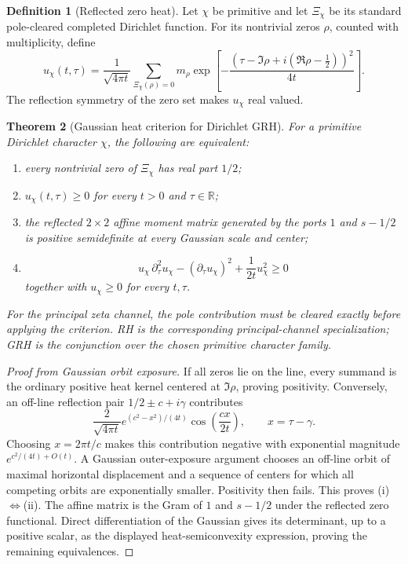 \documentclass[11pt]{article}
\newtheorem{theorem}{Theorem}[section]
\theoremstyle{definition}
\newtheorem{definition}[theorem]{Definition}
\theoremstyle{remark}
\newcommand{\R}{\mathbb R}
\begin{document}
\begin{definition}[Reflected zero heat]
Let $\chi$ be primitive and let $\Xi_\chi$ be its standard pole-cleared
completed Dirichlet function.  For its nontrivial zeros $\rho$, counted with
multiplicity, define
\[
 \boxed{
 u_\chi(t,\tau)
 =\frac1{\sqrt{4\pi t}}
 \sum_{\Xi_\chi(\rho)=0}m_\rho
 \exp\!\left[-\frac{(\tau-\Im\rho
 +i(\Re\rho-\tfrac12))^2}{4t}\right].}
\]
The reflection symmetry of the zero set makes $u_\chi$ real valued.
\end{definition}

\begin{theorem}[Gaussian heat criterion for Dirichlet GRH]
\label{thm:GRH-heat-master}
For a primitive Dirichlet character $\chi$, the following are equivalent:
\begin{enumerate}[label=\textup{(\roman*)},leftmargin=2.7em]
\item every nontrivial zero of $\Xi_\chi$ has real part $1/2$;
\item $u_\chi(t,\tau)\ge0$ for every $t>0$ and $\tau\in\R$;
\item the reflected $2\times2$ affine moment matrix generated by the ports
      $1$ and $s-1/2$ is positive semidefinite at every Gaussian scale and
      center;
\item
      \[
       u_\chi\,\partial_\tau^2u_\chi
       -(\partial_\tau u_\chi)^2
       +\frac1{2t}u_\chi^2\ge0
      \]
      together with $u_\chi\ge0$ for every $t,\tau$.
\end{enumerate}
For the principal zeta channel, the pole contribution must be cleared exactly
before applying the criterion.  RH is the corresponding principal-channel
specialization; GRH is the conjunction over the chosen primitive character
family.
\end{theorem}

\begin{proof}[Proof from Gaussian orbit exposure]
If all zeros lie on the line, every summand is the ordinary positive heat
kernel centered at $\Im\rho$, proving positivity.  Conversely, an off-line
reflection pair $1/2\pm c+i\gamma$ contributes
\[
 \frac{2}{\sqrt{4\pi t}}
 e^{(c^2-x^2)/(4t)}\cos\!\left(\frac{cx}{2t}\right),
 \qquad x=\tau-\gamma.
\]
Choosing $x=2\pi t/c$ makes this contribution negative with exponential
magnitude $e^{c^2/(4t)+O(t)}$.  A Gaussian outer-exposure argument chooses an
off-line orbit of maximal horizontal displacement and a sequence of centers
for which all competing orbits are exponentially smaller.  Positivity then
fails.  This proves \textup{(i)}$\Leftrightarrow$\textup{(ii)}.
The affine matrix is the Gram of $1$ and $s-1/2$ under the reflected zero
functional.  Direct differentiation of the Gaussian gives its determinant,
up to a positive scalar, as the displayed heat-semiconvexity expression,
proving the remaining equivalences.
\end{proof}
\end{document}
